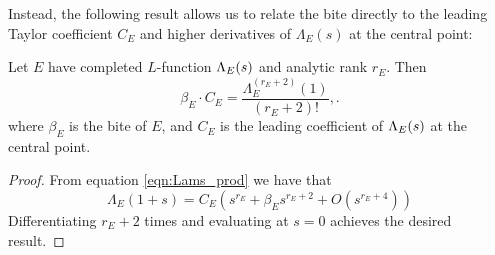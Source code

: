 Instead, the following result allows us to relate the bite directly to the leading Taylor coefficient $C_E$ and higher derivatives of $\Lambda_E(s)$ at the central point:
\begin{proposition}\label{prop:bite_times_leading_coeff}
Let $E$ have completed $L$-function $\Lambda_E(s)$ and analytic rank $r_E$. Then
\begin{equation}
\beta_E\cdot C_E = \frac{\Lambda_E^{(r_E+2)}(1)}{(r_E+2)!},.
\end{equation}
where $\beta_E$ is the bite of $E$, and $C_E$ is the leading coefficient of $\Lambda_E(s)$ at the central point.
\end{proposition}
\begin{proof}
From equation \ref{eqn:Lams_prod} we have that 
\begin{equation}
\Lambda_E(1+s) = C_E\left(s^{r_E} + \beta_E s^{r_E+2} + O(s^{r_E+4})\right)
\end{equation}
Differentiating $r_E+2$ times and evaluating at $s=0$ achieves the desired result.
\end{proof}


